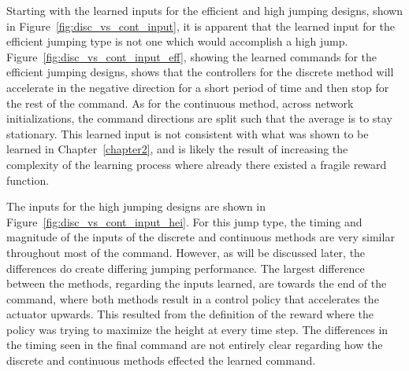 Starting with the learned inputs for the efficient and high jumping designs, shown in Figure~\ref{fig:disc_vs_cont_input}, it is apparent that the learned input for the efficient jumping type is not one which would accomplish a high jump. Figure~\ref{fig:disc_vs_cont_input_eff}, showing the learned commands for the efficient jumping designs, shows that the controllers for the discrete method will accelerate in the negative direction for a short period of time and then stop for the rest of the command. As for the continuous method, across network initializations, the command directions are split such that the average is to stay stationary. This learned input is not consistent with what was shown to be learned in Chapter~\ref{chapter2}, and is likely the result of increasing the complexity of the learning process where already there existed a fragile reward function. 

The inputs for the high jumping designs are shown in Figure~\ref{fig:disc_vs_cont_input_hei}. For this jump type, the timing and magnitude of the inputs of the discrete and continuous methods are very similar throughout most of the command. However, as will be discussed later, the differences do create differing jumping performance. The largest difference between the methods, regarding the inputs learned, are towards the end of the command, where both methods result in a control policy that accelerates the actuator upwards. This resulted from the definition of the reward where the policy was trying to maximize the height at every time step. The differences in the timing seen in the final command are not entirely clear regarding how the discrete and continuous methods effected the learned command. 

